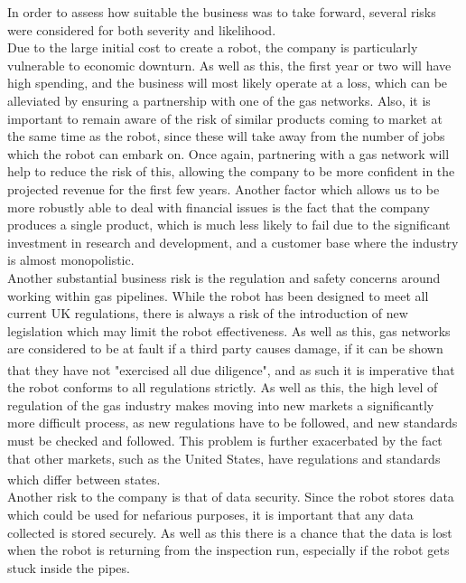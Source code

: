 \documentclass[11pt]{article}		%
\newcommand{\supercite}[1]{\textsuperscript{\cite{#1}}}		%
\begin{document}
     	In order to assess how suitable the business was to take forward, several risks were considered for both severity and likelihood.
     	\\
     	Due to the large initial cost to create a robot, the company is particularly vulnerable to economic downturn.
     	As well as this, the first year or two will have high spending, and the business will most likely operate at a loss, which can be alleviated by ensuring a partnership with one of the gas networks.
     	Also, it is important to remain aware of the risk of similar products coming to market at the same time as the robot, since these will take away from the number of jobs which the robot can embark on.
     	Once again, partnering with a gas network will help to reduce the risk of this, allowing the company to be more confident in the projected revenue for the first few years.
     	Another factor which allows us to be more robustly able to deal with financial issues is the fact that the company produces a single product, which is much less likely to fail due to the significant investment in research and development, and a customer base where the industry is almost monopolistic.
     	\\
     	Another substantial business risk is the regulation and safety concerns around working within gas pipelines.
     	While the robot has been designed to meet all current UK regulations, there  is always a risk of the introduction of new legislation which may limit the robot effectiveness.
     	As well as this, gas networks are considered to be at fault if a third party causes damage, if it can be shown that they have not "exercised all due diligence"\supercite{books1996guide}, and as such it is imperative that the robot conforms to all regulations strictly.
     	As well as this, the high level of regulation of the gas industry makes moving into new markets a significantly more difficult process, as new regulations have to be followed, and new standards must be checked and followed.
     	This problem is further exacerbated by the fact that other markets, such as the United States, have regulations and standards which differ between states\supercite{pless2011making}.
     	\\
     	Another risk to the company is that of data security.
     	Since the robot stores data which could be used for nefarious purposes, it is important that any data collected is stored securely.
     	As well as this there is a chance that the data is lost when the robot is returning from the inspection run, especially if the robot gets stuck inside the pipes.
\end{document}
